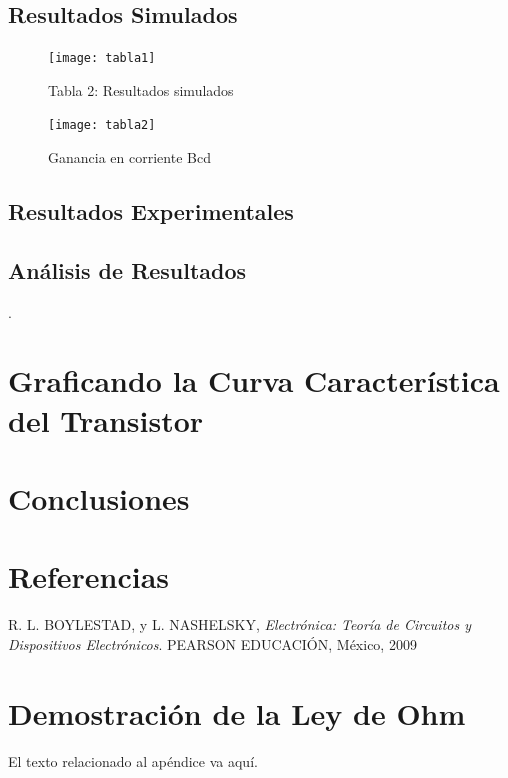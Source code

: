 \documentclass[journal]{IEEEtran}
\begin{document}
\subsection{Resultados Simulados}

\begin{figure}[H]
	\centering
	\texttt{[image: tabla1]}
	\caption{Tabla 2: Resultados simulados}
	\label{fig:Ta1}	
\end{figure}
\hfill

\begin{figure}[H]
	\centering
	\texttt{[image: tabla2]}
	\caption{Ganancia en corriente Bcd}
	\label{fig:Ta2}	
\end{figure}
\hfill
\subsection{Resultados Experimentales}


\vspace{5mm}

\subsection{Análisis de Resultados}

 \cite{Boylestad}. 




\section{Graficando la Curva Característica del Transistor}








\section{Conclusiones}
 
 
\section{Referencias}
R. L. BOYLESTAD, y L. NASHELSKY, 
\textit{Electrónica: Teoría de Circuitos
y Dispositivos Electrónicos}. PEARSON EDUCACIÓN, México, 2009


\appendices
\section{Demostración de la Ley de Ohm}
El texto relacionado al apéndice va aquí.
\end{document}
